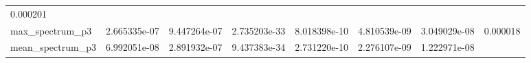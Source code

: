 \documentclass[11pt]{article}
\begin{document}
\begin{longtable}[]{@{}llllllll@{}}
\begin{minipage}[t]{0.08\columnwidth}
0.000201\strut
\end{minipage}\tabularnewline
\begin{minipage}[t]{0.16\columnwidth}\raggedright
max\_spectrum\_p3\strut
\end{minipage} & \begin{minipage}[t]{0.09\columnwidth}\raggedright
2.665335e-07\strut
\end{minipage} & \begin{minipage}[t]{0.09\columnwidth}\raggedright
9.447264e-07\strut
\end{minipage} & \begin{minipage}[t]{0.09\columnwidth}\raggedright
2.735203e-33\strut
\end{minipage} & \begin{minipage}[t]{0.09\columnwidth}\raggedright
8.018398e-10\strut
\end{minipage} & \begin{minipage}[t]{0.09\columnwidth}\raggedright
4.810539e-09\strut
\end{minipage} & \begin{minipage}[t]{0.09\columnwidth}\raggedright
3.049029e-08\strut
\end{minipage} & \begin{minipage}[t]{0.08\columnwidth}\raggedright
0.000018\strut
\end{minipage}\tabularnewline
\begin{minipage}[t]{0.16\columnwidth}\raggedright
mean\_spectrum\_p3\strut
\end{minipage} & \begin{minipage}[t]{0.09\columnwidth}\raggedright
6.992051e-08\strut
\end{minipage} & \begin{minipage}[t]{0.09\columnwidth}\raggedright
2.891932e-07\strut
\end{minipage} & \begin{minipage}[t]{0.09\columnwidth}\raggedright
9.437383e-34\strut
\end{minipage} & \begin{minipage}[t]{0.09\columnwidth}\raggedright
2.731220e-10\strut
\end{minipage} & \begin{minipage}[t]{0.09\columnwidth}\raggedright
2.276107e-09\strut
\end{minipage} & \begin{minipage}[t]{0.09\columnwidth}\raggedright
1.222971e-08\strut
\end{minipage} & \begin{minipage}[t]{0.08\columnwidth}\raggedright

\end{minipage}
\end{longtable}
\end{document}
